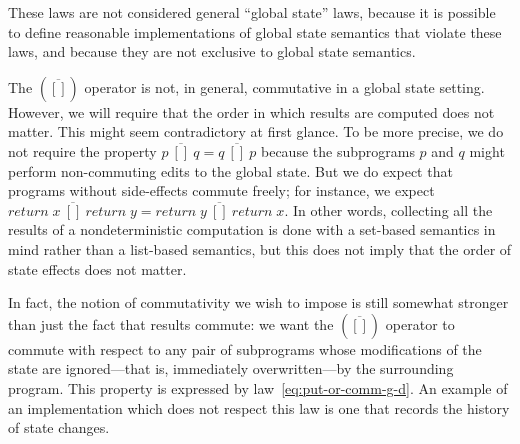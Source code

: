 \documentclass{jfp}
\newcommand{\Varid}[1]{\mathit{#1}}
\let\Varid\mathit
\begin{document}
These laws are not considered general ``global state'' laws, because it is
possible to define reasonable implementations of global state semantics that
violate these laws, and because they are not exclusive to global state
semantics.

The \ensuremath{(\overline{[\!]})} operator is not, in general, commutative in a global state setting.
However, we will require that the order in which results are computed does not
matter.
This might seem contradictory at first glance.
To be more precise, we do not require the property
\ensuremath{\Varid{p}~\overline{[\!]}~\Varid{q}\mathrel{=}\Varid{q}~\overline{[\!]}~\Varid{p}} because the subprograms \ensuremath{\Varid{p}} and \ensuremath{\Varid{q}} might perform
non-commuting edits to the global state.
But we do expect that programs without side-effects commute freely;
for instance, we expect \ensuremath{\Varid{return}\;\Varid{x}~\overline{[\!]}~\Varid{return}\;\Varid{y}\mathrel{=}\Varid{return}\;\Varid{y}~\overline{[\!]}~\Varid{return}\;\Varid{x}}.
In other words, collecting all the results of a nondeterministic computation is
done with a set-based semantics in mind rather than a list-based semantics,
but this does not imply that the order of state effects does not matter.

In fact, the notion of commutativity we wish to impose is still somewhat
stronger than just the fact that results commute: we want the \ensuremath{(\overline{[\!]})} operator
to commute with respect to any pair of subprograms whose modifications of the
state are ignored---that is, immediately overwritten---by the
surrounding program.
This property is expressed by law~\eqref{eq:put-or-comm-g-d}.
An example of an implementation which does not respect this law is one that
records the history of state changes.
\end{document}
